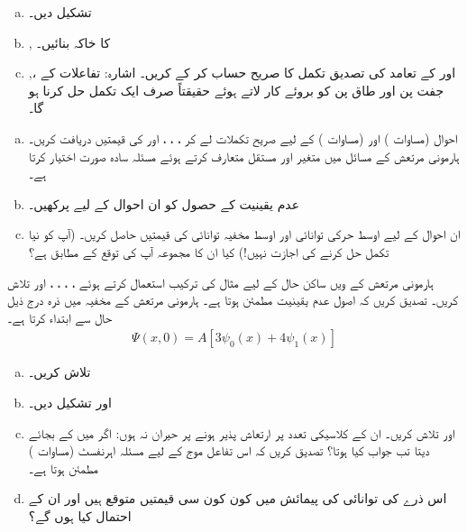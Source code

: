 \begin{enumerate}[a.]
\item
{}    تشکیل  دیں۔
\item
{}, کا خاکہ بنائیں۔
\item
{},، اور  کے تعامد کی تصدیق    تکمل  کا صریح حساب  کر  کے کریں۔ اشارہ: تفاعلات کے  جفت پن اور طاق پن کو بروئے کار لاتے ہوئے حقیقتاً صرف ایک تکمل حل کرنا ہو گا۔
\end{enumerate}
\begin{enumerate}[a.]
\item
احوال  (مساوات ) اور  (مساوات ) کے لیے صریح تکملات لے کر ، ، ، اور  کی قیمتیں دریافت کریں۔    ہارمونی مرتعش کے مسائل میں متغیر   اور  مستقل    متعارف کرتے ہوئے مسئلہ سادہ صورت اختیار کرتا ہے۔
\item
عدم یقینیت کے حصول کو ان احوال کے لیے پرکھیں۔
\item
ان احوال کے لیے اوسط حرکی توانائی اور اوسط مخفیہ توانائی  کی قیمتیں حاصل کریں۔ (آپ کو نیا تکمل حل کرنے کی اجازت نہیں!)  کیا ان کا مجموعہ آپ کی توقع کے مطابق ہے؟
\end{enumerate}
ہارمونی مرتعش کے   ویں ساکن حال کے لیے مثال  
کی ترکیب استعمال کرتے ہوئے ، ، ، ،  اور   تلاش کریں۔ تصدیق کریں کہ اصول عدم یقینیت مطمئن ہوتا ہے۔
ہارمونی مرتعش کے  مخفیہ میں   ذرہ درج ذیل حال سے ابتداء کرتا ہے۔
\begin{align*}
\Psi(x,0)=A[3\psi_{0}(x)+4\psi_{1}(x)]
\end{align*}
\begin{enumerate}[a.]
\item
{}  تلاش کریں۔
\item
{} اور   تشکیل دیں۔
\item
{} اور   تلاش کریں۔ ان کے کلاسیکی تعدد پر ارتعاش پذیر ہونے پر حیران  نہ  ہوں: اگر میں  کے بجائے   دیتا تب جواب کیا ہوتا؟  تصدیق کریں کہ اس تفاعل موج کے لیے مسئلہ اہرنفسٹ (مساوات ) مطمئن ہوتا ہے۔
\item
اس ذرے کی توانائی کی پیمائش میں کون کون سی قیمتیں متوقع ہیں اور ان کے احتمال کیا ہوں گے؟
\end{enumerate}
